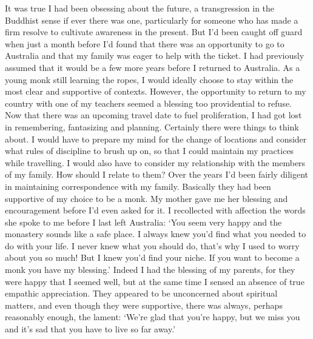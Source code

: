 It was true I had been obsessing about the future, a transgression in
the Buddhist sense if ever there was one, particularly for someone who
has made a firm resolve to cultivate awareness in the present. But I'd
been caught off guard when just a month before I'd found that there was
an opportunity to go to Australia and that my family was eager to help
with the ticket. I had previously assumed that it would be a few more
years before I returned to Australia. As a young monk still learning the
ropes, I would ideally choose to stay within the most clear and
supportive of contexts. However, the opportunity to return to my country
with one of my teachers seemed a blessing too providential to refuse. 
Now that there was an upcoming travel date to fuel proliferation, I had
got lost in remembering, fantasizing and planning. Certainly there were
things to think about. I would have to prepare my mind for the change of
locations and consider what rules of discipline to brush up on, so that
I could maintain my practices while travelling. I would also have to
consider my relationship with the members of my family. How should I
relate to them? Over the years I'd been fairly diligent in maintaining
correspondence with my family. Basically they had been supportive of my
choice to be a monk. My mother gave me her blessing and encouragement
before I'd even asked for it. I recollected with affection the words she
spoke to me before I last left Australia: `You seem very happy and the
monastery sounds like a safe place. I always knew you'd find what you
needed to do with your life. I never knew what you should do, that's why
I used to worry about you so much! But I knew you'd find your niche. If
you want to become a monk you have my blessing.' Indeed I had the
blessing of my parents, for they were happy that I seemed well, but at
the same time I sensed an absence of true empathic appreciation. They
appeared to be unconcerned about spiritual matters, and even though they
were supportive, there was always, perhaps reasonably enough, the
lament: `We're glad that you're happy, but we miss you and it's sad that
you have to live so far away.'


